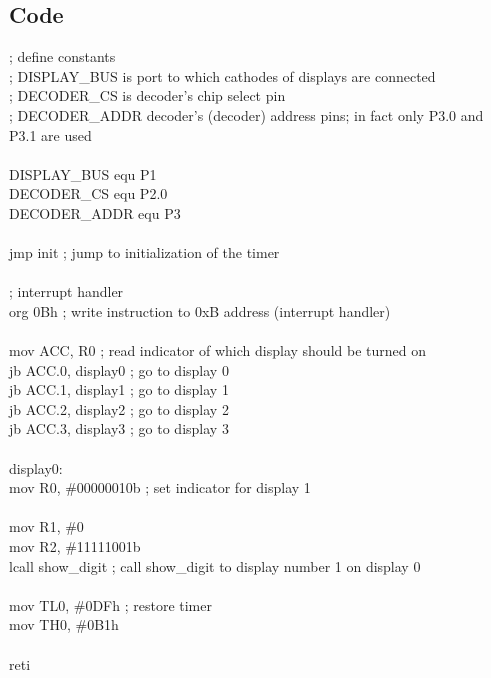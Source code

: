 \documentclass{article}
\begin{document}
\subsection{Code}
\ttfamily
; define constants\\
; DISPLAY\_BUS is port to which cathodes of displays are connected\\
; DECODER\_CS is decoder's chip select pin\\
; DECODER\_ADDR decoder's (decoder) address pins; in fact only P3.0 and P3.1 are used\\
\\
DISPLAY\_BUS     equ     P1\\
DECODER\_CS      equ     P2.0\\
DECODER\_ADDR    equ     P3\\
\\
    jmp     init                ; jump to initialization of the timer\\
\\
    ; interrupt handler\\
    org     0Bh                 ; write instruction to 0xB address (interrupt handler)\\
\\
    mov     ACC, R0             ; read indicator of which display should be turned on\\
    jb      ACC.0, display0     ; go to display 0\\
    jb      ACC.1, display1     ; go to display 1\\
    jb      ACC.2, display2     ; go to display 2\\
    jb      ACC.3, display3     ; go to display 3\\
\\
display0:\\
    mov     R0, \#00000010b      ; set indicator for display 1\\
    \\
    mov     R1, \#0              \\
    mov     R2, \#11111001b\\
    lcall   show\_digit          ; call show\_digit to display number 1 on display 0\\
    \\
    mov     TL0, \#0DFh          ; restore timer\\
    mov     TH0, \#0B1h\\
\\
    reti\\
\\
\end{document}
